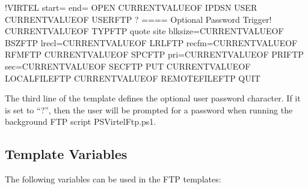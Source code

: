 \documentclass[letterpaper,10pt,english]{sphinxmanual}
\begin{document}
\begin{sphinxVerbatim}[commandchars=\\\{\}]
\PYGZlt{}!\PYGZhy{}\PYGZhy{}VIRTEL start=\PYGZdq{}\PYGZob{}\PYGZob{}\PYGZob{}\PYGZdq{} end=\PYGZdq{}\PYGZcb{}\PYGZcb{}\PYGZcb{}\PYGZdq{} \PYGZhy{}\PYGZhy{}\PYGZgt{}OPEN \PYGZob{}\PYGZob{}\PYGZob{}CURRENT\PYGZhy{}VALUE\PYGZhy{}OF \PYGZdq{}IPDSN\PYGZdq{}\PYGZcb{}\PYGZcb{}\PYGZcb{}
USER \PYGZob{}\PYGZob{}\PYGZob{}CURRENT\PYGZhy{}VALUE\PYGZhy{}OF \PYGZdq{}USERFTP\PYGZdq{}\PYGZcb{}\PYGZcb{}\PYGZcb{}
?                                                                           \PYGZlt{}==== Optional Password Trigger!
\PYGZob{}\PYGZob{}\PYGZob{}CURRENT\PYGZhy{}VALUE\PYGZhy{}OF \PYGZdq{}TYPFTP\PYGZdq{}\PYGZcb{}\PYGZcb{}\PYGZcb{}
quote site blksize=\PYGZob{}\PYGZob{}\PYGZob{}CURRENT\PYGZhy{}VALUE\PYGZhy{}OF \PYGZdq{}BSZFTP\PYGZdq{}\PYGZcb{}\PYGZcb{}\PYGZcb{} lrecl=\PYGZob{}\PYGZob{}\PYGZob{}CURRENT\PYGZhy{}VALUE\PYGZhy{}OF \PYGZdq{}LRLFTP\PYGZdq{}\PYGZcb{}\PYGZcb{}\PYGZcb{} recfm=\PYGZob{}\PYGZob{}\PYGZob{}CURRENT\PYGZhy{}VALUE\PYGZhy{}OF \PYGZdq{}RFMFTP\PYGZdq{}\PYGZcb{}\PYGZcb{}\PYGZcb{}
\PYGZob{}\PYGZob{}\PYGZob{}CURRENT\PYGZhy{}VALUE\PYGZhy{}OF \PYGZdq{}SPCFTP\PYGZdq{}\PYGZcb{}\PYGZcb{}\PYGZcb{} pri=\PYGZob{}\PYGZob{}\PYGZob{}CURRENT\PYGZhy{}VALUE\PYGZhy{}OF \PYGZdq{}PRIFTP\PYGZdq{}\PYGZcb{}\PYGZcb{}\PYGZcb{} sec=\PYGZob{}\PYGZob{}\PYGZob{}CURRENT\PYGZhy{}VALUE\PYGZhy{}OF \PYGZdq{}SECFTP\PYGZdq{}\PYGZcb{}\PYGZcb{}\PYGZcb{}
PUT \PYGZob{}\PYGZob{}\PYGZob{}CURRENT\PYGZhy{}VALUE\PYGZhy{}OF \PYGZdq{}LOCALFILEFTP\PYGZdq{}\PYGZcb{}\PYGZcb{}\PYGZcb{} \PYGZob{}\PYGZob{}\PYGZob{}CURRENT\PYGZhy{}VALUE\PYGZhy{}OF \PYGZdq{}REMOTEFILEFTP\PYGZdq{}\PYGZcb{}\PYGZcb{}\PYGZcb{}
QUIT
\end{sphinxVerbatim}

\sphinxAtStartPar
The third line of the template defines the optional user password character. If it is set to “?”, then the user will be prompted for a password when running the background FTP script PSVirtelFtp.ps1.


\subsection{Template Variables}
\label{\detokenize{Customization:template-variables}}
\sphinxAtStartPar
The following variables can be used in the FTP templates:
\end{document}
